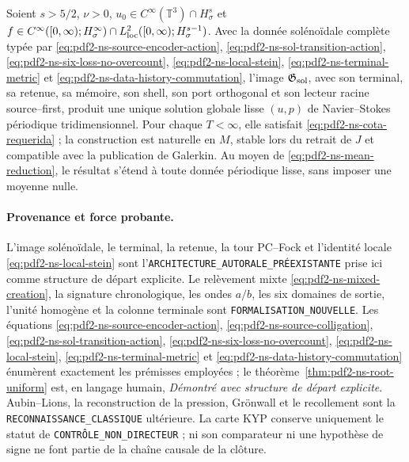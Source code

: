 \begin{theorem}
\label{thm:pdf2-ns-global}
Soient $s>5/2$, $\nu>0$,
$u_0\in C^\infty(\mathbb T^3)\cap H^s_\sigma$ et
$f\in C^\infty([0,\infty);H^\infty_\sigma)
\cap L^2_{\rm loc}([0,\infty);H^{s-1}_\sigma)$. Avec la donnée solénoïdale complète
typée par \eqref{eq:pdf2-ns-source-encoder-action},
\eqref{eq:pdf2-ns-sol-transition-action},
\eqref{eq:pdf2-ns-six-loss-no-overcount},
\eqref{eq:pdf2-ns-local-stein},
\eqref{eq:pdf2-ns-terminal-metric} et
\eqref{eq:pdf2-ns-data-history-commutation}, l'image
$\mathfrak G_{\rm sol}$, avec son terminal,
sa retenue, sa mémoire, son shell, son port orthogonal et son lecteur racine source--first, produit une unique
solution globale lisse $(u,p)$ de Navier--Stokes périodique tridimensionnel. Pour chaque
$T<\infty$, elle satisfait \eqref{eq:pdf2-ns-cota-requerida} ; la construction est naturelle en
$M$, stable lors du retrait de $J$ et compatible avec la publication de Galerkin. Au moyen de
\eqref{eq:pdf2-ns-mean-reduction}, le résultat s'étend à toute donnée
périodique lisse, sans imposer une moyenne nulle.
\end{theorem}

\paragraph{Provenance et force probante.}
L'image solénoïdale, le terminal, la retenue, la tour PC--Fock et l'identité locale
\eqref{eq:pdf2-ns-local-stein} sont
l'\texttt{ARCHITECTURE\_AUTORALE\_PRÉEXISTANTE} prise ici comme structure de départ
explicite. Le relèvement mixte \eqref{eq:pdf2-ns-mixed-creation}, la signature chronologique,
les ondes $a/b$, les six domaines de sortie, l'unité homogène et la colonne
terminale sont \texttt{FORMALISATION\_NOUVELLE}. Les équations
\eqref{eq:pdf2-ns-source-encoder-action},
\eqref{eq:pdf2-ns-source-colligation},
\eqref{eq:pdf2-ns-sol-transition-action},
\eqref{eq:pdf2-ns-six-loss-no-overcount},
\eqref{eq:pdf2-ns-local-stein},
\eqref{eq:pdf2-ns-terminal-metric} et
\eqref{eq:pdf2-ns-data-history-commutation} énumèrent exactement les prémisses
employées ; le
théorème~\ref{thm:pdf2-ns-root-uniform} est, en langage humain, \emph{Démontré avec
structure de départ explicite}. Aubin--Lions, la
reconstruction de la pression, Grönwall et le recollement sont la
\texttt{RECONNAISSANCE\_CLASSIQUE} ultérieure. La carte KYP conserve uniquement le statut de
\texttt{CONTRÔLE\_NON\_DIRECTEUR} ; ni son comparateur ni une hypothèse de signe ne font
partie de la chaîne causale de la clôture.

